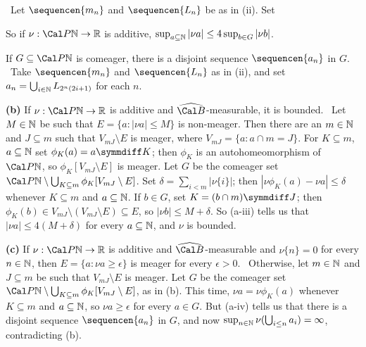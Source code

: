 {\noindent\Prf\ Let $\sequencen{m_n}$ and $\sequencen{L_n}$ be as in (ii).
Set



\noindent So if $\nu:\Cal P\Bbb N\to\Bbb R$ is additive,
$\sup_{a\subseteq\Bbb N}|\nu a|\le 4\sup_{b\in G}|\nu b|$.

\medskip

 If $G\subseteq\Cal P\Bbb N$ is comeager, there is a
disjoint sequence $\sequencen{a_n}$ in $G$.   \Prf\ Take
$\sequencen{m_n}$ and $\sequencen{L_n}$ as in (ii), and set
$a_n=\bigcup_{i\in\Bbb N}L_{2^n(2i+1)}$ for each $n$.\ \Qed

\medskip

{\bf (b)} If $\nu:\Cal P\Bbb N\to\Bbb R$ is additive and
$\widehat{\Cal B}$-measurable,
it is bounded.   \Prf\ Let $M\in\Bbb N$ be such that
$E=\{a:|\nu a|\le M\}$ is non-meager.   Then there are an $m\in\Bbb N$ and
$J\subseteq m$ such that $V_{mJ}\setminus E$ is meager, where
$V_{mJ}=\{a:a\cap m=J\}$.   For $K\subseteq m$, $a\subseteq\Bbb N$
set $\phi_K(a)=a\symmdiff K$;  then $\phi_K$ is an autohomeomorphism of
$\Cal P\Bbb N$, so $\phi_K[V_{mJ}\setminus E]$ is meager.   Let $G$ be the
comeager set
$\Cal P\Bbb N\setminus\bigcup_{K\subseteq m}\phi_K[V_{mJ}\setminus E]$.
Set $\delta=\sum_{i<m}|\nu\{i\}|$;  then
$|\nu\phi_K(a)-\nu a|\le\delta$ whenever $K\subseteq m$
and $a\subseteq\Bbb N$.   If $b\in G$, set $K=(b\cap m)\symmdiff J$;  then
$\phi_K(b)\in V_{mJ}\setminus(V_{mJ}\setminus E)\subseteq E$, so
$|\nu b|\le M+\delta$.   So (a-iii) tells us that $|\nu a|\le 4(M+\delta)$
for every $a\subseteq\Bbb N$, and $\nu$ is bounded.\ \Qed

\medskip

{\bf (c)} If $\nu:\Cal P\Bbb N\to\Bbb R$ is
additive and $\widehat{\Cal B}$-measurable
and $\nu\{n\}=0$ for every $n\in\Bbb N$, then $E=\{a:\nu a\ge\epsilon\}$ is
meager for every $\epsilon>0$.
\Prf\Quer\ Otherwise, let $m\in\Bbb N$ and $J\subseteq m$ be such that
$V_{mJ}\setminus E$ is meager.   Let $G$ be the comeager set
$\Cal P\Bbb N\setminus\bigcup_{K\subseteq m}\phi_K[V_{mJ}\setminus E]$, as
in (b).   This time, $\nu a=\nu\phi_K(a)$ whenever $K\subseteq m$ and
$a\subseteq\Bbb N$, so $\nu a\ge\epsilon$ for every $a\in G$.   But
(a-iv) tells us that there is a disjoint sequence
$\sequencen{a_n}$ in $G$, and now
$\sup_{n\in\Bbb N}\nu(\bigcup_{i\le n}a_i)=\infty$, contradicting (b).\
\Bang\Qed

}
